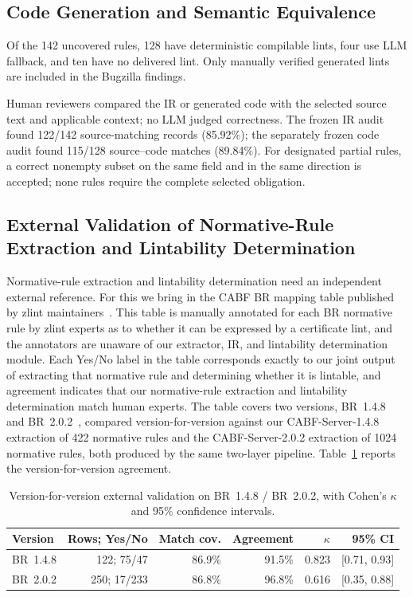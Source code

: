 \subsection{Code Generation and Semantic Equivalence}
\label{subsec:codegen-results}

Of the 142 uncovered rules, 128 have deterministic compilable lints, four use
LLM fallback, and ten have no delivered lint. Only manually verified generated
lints are included in the Bugzilla findings.

Human reviewers compared the IR or generated code with the selected source
text and applicable context; no LLM judged correctness. The frozen IR audit
found 122/142 source-matching records (85.92\%); the separately frozen code
audit found 115/128 source--code matches (89.84\%). For designated partial
rules, a correct nonempty subset on the same field and in the same direction
is accepted; none rules require the complete selected obligation.

\subsection{External Validation of Normative-Rule Extraction and Lintability
Determination}
\label{subsec:lintability-ext}

Normative-rule extraction and lintability determination need an independent external
reference. For this we bring in the CABF BR mapping table published by zlint
maintainers~\cite{zlint-mapping-sheet}. This table is manually annotated for each BR
normative rule by zlint experts as to whether it can be expressed by a certificate lint,
and the annotators are unaware of our extractor, IR, and lintability determination
module. Each Yes/No label in the table corresponds exactly to our joint output
of extracting that normative rule and determining whether it is lintable, and
agreement indicates that our normative-rule extraction and lintability determination match
human experts. The table covers two versions, BR~1.4.8~\cite{cabf-br148-md} and
BR~2.0.2~\cite{cabf-br202-md}, compared version-for-version against our
CABF-Server-1.4.8 extraction of 422 normative rules and the CABF-Server-2.0.2 extraction of 1024
normative rules, both produced by the same two-layer pipeline. Table~\ref{tab:extval}
reports the version-for-version agreement.

\begin{table}[!htbp]
\centering
\scriptsize
\setlength{\tabcolsep}{3pt}
\caption{Version-for-version external validation on BR~1.4.8 / BR~2.0.2, with
Cohen's $\kappa$ and 95\% confidence intervals.}
\label{tab:extval}
\begin{tabular*}{\columnwidth}{@{\extracolsep{\fill}}lrrrrr@{}}
\toprule
Version & Rows; Yes/No & Match cov. & Agreement & $\kappa$ & 95\% CI \\
\midrule
BR~1.4.8 & 122; 75/47 & 86.9\% & 91.5\% & 0.823 & [0.71, 0.93] \\
BR~2.0.2 & 250; 17/233 & 86.8\% & 96.8\% & 0.616 & [0.35, 0.88] \\
\bottomrule
\end{tabular*}
\end{table}

